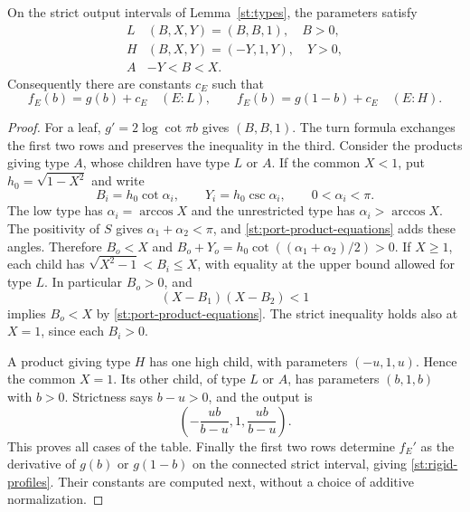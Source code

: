 \begin{proposition}\label{st:port-types}
On the strict output intervals of Lemma~\ref{st:types}, the parameters satisfy
\begin{equation}\label{st:parameter-table}
 \begin{array}{c|c}
 L&(B,X,Y)=(B,B,1),\quad B>0,\\
 H&(B,X,Y)=(-Y,1,Y),\quad Y>0,\\
 A&-Y<B<X.
 \end{array}
\end{equation}
Consequently there are constants $c_E$ such that
\begin{equation}\label{st:rigid-profiles}
 f_E(b)=g(b)+c_E\quad(E:L),\qquad
 f_E(b)=g(1-b)+c_E\quad(E:H).
\end{equation}
\end{proposition}
\begin{proof}
For a leaf, $g'=2\log\cot\pi b$ gives $(B,B,1)$.
The turn formula exchanges the first two rows and
preserves the inequality in the third.
Consider the products giving type $A$, whose children
have type $L$ or $A$.
If the common $X<1$, put $h_0=\sqrt{1-X^2}$ and write
\[
 B_i=h_0\cot\alpha_i,\qquad
 Y_i=h_0\csc\alpha_i,\qquad 0<\alpha_i<\pi.
\]
The low type has $\alpha_i=\arccos X$ and the
unrestricted type has $\alpha_i>\arccos X$.
The positivity of $S$ gives $\alpha_1+\alpha_2<\pi$,
and \eqref{st:port-product-equations} adds these angles.
Therefore $B_o<X$ and
$B_o+Y_o=h_0\cot((\alpha_1+\alpha_2)/2)>0$.
If $X\ge1$, each child has
$\sqrt{X^2-1}<B_i\le X$, with equality at the
upper bound allowed for type $L$.
In particular $B_o>0$, and
\[
 (X-B_1)(X-B_2)<1
\]
implies $B_o<X$ by \eqref{st:port-product-equations}.
The strict inequality holds also at $X=1$, since
each $B_i>0$.

A product giving type $H$ has one high child, with
parameters $(-u,1,u)$. Hence the common $X=1$.
Its other child, of type $L$ or $A$, has parameters
$(b,1,b)$ with $b>0$. Strictness says $b-u>0$,
and the output is
\[
 \left(-\frac{ub}{b-u},1,\frac{ub}{b-u}\right).
\]
This proves all cases of the table.
Finally the first two rows determine $f_E'$ as
the derivative of $g(b)$ or $g(1-b)$ on the
connected strict interval, giving \eqref{st:rigid-profiles}.
Their constants are computed next, without a choice
of additive normalization.
\end{proof}

